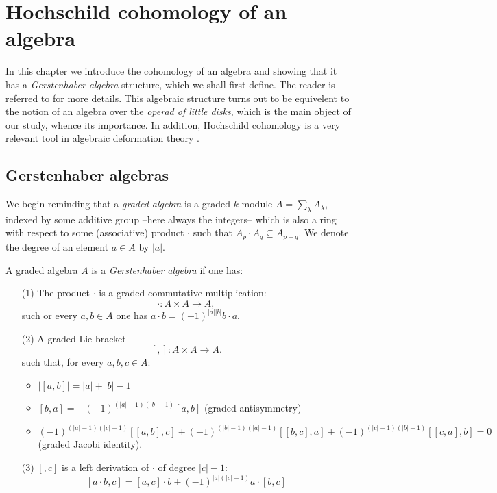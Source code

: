 \documentclass[TFM.tex]{subfiles}
\begin{document}
\chapter{Hochschild cohomology of an algebra}

In this chapter we introduce the cohomology of an algebra and showing that it has a \emph{Gerstenhaber algebra} structure, which we shall first define. The reader is referred to \cite{Gerstenhaber} for more details. This algebraic structure turns out to be equivelent to the notion of an algebra over the \emph{operad of little disks}, which is the main object of our study, whence its importance. In addition, Hochschild cohomology is a very relevant tool in algebraic deformation theory \cite{deformation}.


\section{Gerstenhaber algebras}

 We begin reminding that a \emph{graded algebra} is a graded $k$-module  $A=\sum_\lambda A_\lambda$, indexed by some additive group --here always the integers-- which is also a ring with respect to some (associative) product $\cdot$ such that $A_p\cdot A_q\subseteq A_{p+q}$. We denote the degree of an element $a\in A$ by $|a|$. %


\begin{defi}\label{defi1}
A graded algebra $A$ is a \emph{Gerstenhaber algebra} if one has:
\begin{enumerate}
\item[(1)] The product $\cdot$ is a graded commutative multiplication:
\[
\cdot: A\times A\to A,
\]
such or every $a,b\in A$ one has $a\cdot b=(-1)^{|a||b|}b\cdot a$.

\item[(2)] A graded Lie bracket 
\[
[,]:A\times A\to A.
\]
such that, for every $a,b,c\in A$:
\begin{itemize}
\item $|[a,b]|=|a|+|b|-1$
\item $[b,a]=-(-1)^{(|a|-1)(|b|-1)}[a,b]$ (graded antisymmetry)
\item $(-1)^{(|a|-1)(|c|-1)}[[a,b],c]+(-1)^{(|b|-1)(|a|-1)}[[b,c],a]+(-1)^{(|c|-1)(|b|-1)}[[c,a],b]=0$ (graded Jacobi identity). 
\end{itemize}
\item[(3)]  $[,c]$ is a left derivation of $\cdot$ of degree $|c|-1$: %
\[
[a\cdot b,c]=[a,c]\cdot b+(-1)^{|a|(|c|-1)}a\cdot [b,c]
\]
\end{enumerate}
\end{defi}
\end{document}
